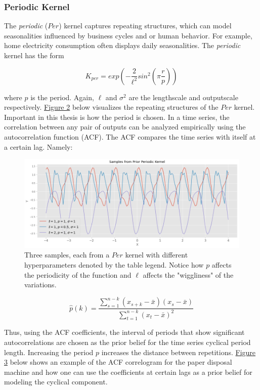 \subsubsection{Periodic Kernel}

The \textit{periodic} ($Per$) kernel captures repeating structures, which can model seasonalities influenced by business cycles and or human behavior. For example, home electricity consumption often displays daily seasonalities. The \textit{periodic} kernel has the form

\begin{equation}
K_{per} = exp(-\frac{2}{\ell^2} sin^2 (\pi \frac{r}{p}))
\end{equation}

where $p$ is the period. Again, $\ell$ and $\sigma^2$ are the lengthscale and outputscale respectively. \hyperlink{figure.2}{Figure 2} below visualizes the repeating structures of the $Per$ kernel. Important in this thesis is how the period is chosen. In a time series, the correlation between any pair of outputs can be analyzed empirically using the autocorrelation function (ACF). The ACF compares the time series with itself at a certain lag. Namely:

\begin{figure}[htp]
\centering
\graphicspath{ {./images/} }
\includegraphics[scale=0.49]{images/samples_periodic_prior.png}
\caption{Three samples, each from a $Per$ kernel with different hyperparameters denoted by the table legend. Notice how $p$ affects the periodicity of the function and $\ell$ affects the "wiggliness" of the variations.}
\end{figure}

\begin{equation}
    \hat{p}(k) = \frac{\sum_{s=1}^{n-k}(x_{s+k} - \bar{x})(x_s - \bar{x})}{\sum_{t=1}^{n-k}(x_t - \bar{x})^2} 
\end{equation}

Thus, using the ACF coefficients, the interval of periods that show significant autocorrelations are chosen as the prior belief for the time series cyclical period length. Increasing the period $p$ increases the distance between repetitions. \hyperlink{figure.3}{Figure 3} below shows an example of the ACF correlogram for the paper disposal machine and how one can use the coefficients at certain lags as a prior belief for modeling the cyclical component. 

